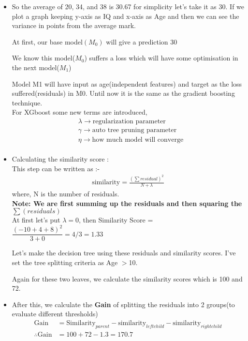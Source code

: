 \documentclass[a4paper, 11pt]{article}
\begin{document}
    \begin{itemize}
        \item   So the average of 20, 34, and 38 is 30.67 for simplicity let’s take it as 30.  
        If we plot a graph keeping y-axis as IQ and x-axis as Age and then we can see the variance in points from the average mark. 
  
        At first, our base model$(M_0)$ will give a prediction 30

  
      We know this model($M_0$) suffers a loss which will have some optimisation in the next model($M_1$)
  
      Model M1 will have input as age(independent features) and target as the loss suffered(residuals) in M0. Until now it is the same as the gradient boosting technique.\\
      For XGboost some new terms are introduced, 
      \begin{align}
              &\lambda \rightarrow \text{regularization parameter} \\
              &\gamma \rightarrow \text{auto tree pruning parameter} \\
              &\eta \rightarrow \text{how much model will converge} \\
      \end{align}
        \item Calculating the similarity score :\\
          This step can be written as :-
          \begin{align}
            \text{similarity} = \frac{(\sum residual)^2}{N+\lambda}
          \end{align}
          where, N is the number of residuals. \\
          \textbf{Note: We are first summing up the residuals and then squaring the $\sum(residuals)$}\\
          
          At first let's put  $\lambda =0$, then Similarity Score = $\dfrac{(-10+4+8)^2}{3+0} = 4/3 = 1.33$ 

          Let’s make the decision tree using these residuals and similarity scores. I’ve set the tree splitting criteria as Age $>$10.
          
          Again for these two leaves, we calculate the similarity scores which is 100 and 72. 
          
        \item After this, we calculate the \textbf{Gain} of splitting the residuals into 2 groups(to evaluate different thresholds)
        \begin{align}
            \text{Gain} &= \text{Similarity}_{parent} - \text{similarity}_{left child} - \text{similarity}_{right child}\\
            \therefore \text{Gain} &= 100+72 - 1.3 = 170.7
        \end{align}
          

\end{itemize}
\end{document}
